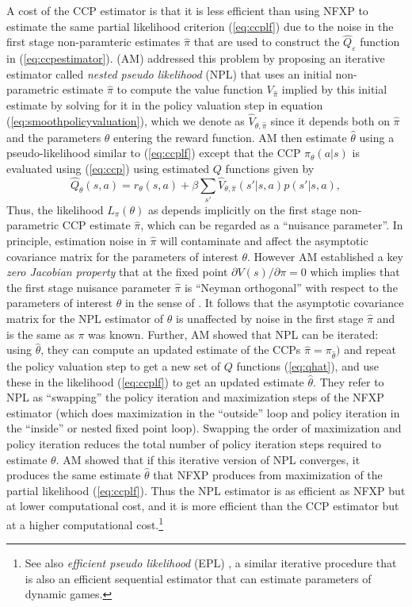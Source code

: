 A cost of the CCP estimator is that it is less efficient than using NFXP to estimate the same partial likelihood criterion (\ref{eq:ccplf})
due to the noise in the first stage non-paramteric estimates $\hat\pi$ that are used to construct
the $\hat Q_\varepsilon$ function in (\ref{eq:ccpestimator}).  \citet{AguirregabiriaMira:2002} (AM) addressed this problem
by proposing an iterative estimator called {\it nested pseudo likelihood\/} (NPL)  that uses an initial non-parametric estimate $\hat\pi$ 
to compute the value function $V_{\hat\pi}$ implied by this initial estimate by solving for it in the policy valuation step
in equation (\ref{eq:smoothpolicyvaluation}), which we denote as $\hat V_{\theta,\hat\pi}$ since it depends
both on $\hat\pi$ and the parameters $\theta$ entering
the reward function. AM then  estimate  $\hat\theta$ using a pseudo-likelihood similar to (\ref{eq:ccplf})
except that the CCP $\pi_\theta(a|s)$ is evaluated using (\ref{eq:ccp}) using estimated $Q$ functions given by
\begin{equation}
                  \hat Q_\theta(s,a)=r_\theta(s,a)+\beta \sum_{s'}\hat V_{\theta,\hat\pi}(s'|s,a)p(s'|s,a),
\label{eq:qhat}
\end{equation}
Thus, the likelihood $L_\pi(\theta)$ as depends implicitly on the first stage non-parametric CCP estimate $\hat\pi$, which can be regarded
as a ``nuisance parameter''. In principle, estimation noise in $\hat\pi$ will contaminate and affect the asymptotic 
covariance matrix for the parameters of interest $\theta$. However 
AM established a key {\it zero Jacobian property\/} that at the fixed point $\partial V(s)/\partial \pi=0$ 
which  implies that  the first stage nuisance parameter $\hat\pi$
is ``Neyman orthogonal'' with respect to the parameters of interest $\theta$ in the sense of \citet{lrspe:2022}. It follows 
that the asymptotic covariance matrix
for the NPL estimator of $\theta$ is unaffected by noise in the first stage $\hat\pi$ and is the same 
as $\pi$  was known. Further, 
AM showed that NPL can be iterated: using $\hat\theta$, they can compute an updated estimate of the CCPs 
$\hat\pi=\pi_{\hat\theta})$ and repeat the policy valuation step to get a new set of $Q$ functions (\ref{eq:qhat}), and use 
these in the likelihood (\ref{eq:ccplf}) to get an updated estimate $\hat\theta$. They refer to NPL as ``swapping''
the policy iteration and maximization steps of the NFXP estimator (which does maximization in the ``outside'' loop
and policy iteration in the ``inside'' or nested fixed point loop). Swapping the order of maximization
and policy iteration reduces the total number of policy iteration steps required to 
estimate $\theta$. AM showed that if this iterative version of  NPL converges, it produces the
same  estimate $\hat\theta$ that  NFXP produces from maximization of the partial likelihood  (\ref{eq:ccplf}).
Thus the NPL estimator is as efficient as NFXP but at lower computational cost, and it is more efficient than the CCP
estimator but at a higher computational cost.\footnote{\footnotesize
See also {\it efficient pseudo likelihood\/} (EPL) \citep{dearingblevins:2025}, a similar iterative
procedure that is also an efficient sequential estimator that 
can estimate parameters of dynamic games.}  

